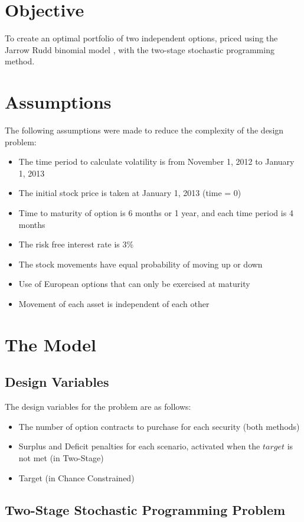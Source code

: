 \documentclass[12pt]{article}
\begin{document}
\section{Objective}
To create an optimal portfolio of two independent options, priced using the Jarrow Rudd binomial model \cite{jarrow1983option, jrudd_other, jrudd_impl}, with the two-stage stochastic programming method.

\section{Assumptions}
The following assumptions were made to reduce the complexity of the design problem:
\begin{itemize}
	\item The time period to calculate volatility is from November 1, 2012 to January 1, 2013
	\item The initial stock price is taken at January 1, 2013 (time = 0)
	\item Time to maturity of option is 6 months or 1 year, and each time period is 4 months
	\item The risk free interest rate is 3\%
	\item The stock movements have equal probability of moving up or down
	\item Use of European options that can only be exercised at maturity
	\item Movement of each asset is independent of each other
\end{itemize}


\section{The Model}
\subsection{Design Variables}
The design variables for the problem are as follows:
\begin{itemize}
	\item The number of option contracts to purchase for each security (both methods)
	\item Surplus and Deficit penalties for each scenario, activated when the $target$ is not met (in Two-Stage)
	\item Target (in Chance Constrained)
\end{itemize}

\newpage
\subsection{Two-Stage Stochastic Programming Problem}
\end{document}
